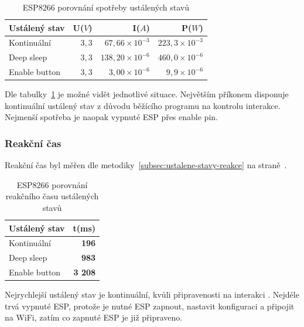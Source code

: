 \documentclass[a4paper, 12pt]{report}
\begin{document}
    \begin{table}[h]
        \centering
        \caption{ESP8266 porovnání spotřeby ustálených stavů}
        \begin{tabular}{||l|r r r||}
            \hline
            Ustálený stav & U($V$) & I($A$)                  & P($W$)                 \\
            \hline
            Kontinuální   & $3,3$  & $67,66 \times 10^{-3}$  & $223,3 \times 10^{-3}$ \\
            Deep sleep    & $3,3$  & $138,20 \times 10^{-6}$ & $460,0 \times 10^{-6}$ \\
            Enable button & $3,3$  & $3,00\times 10^{-6}$    & $9,9\times 10^{-6}$    \\
            \hline
        \end{tabular}
        \label{tab:esp8266-klidove-rezimy-spotreba}
    \end{table}
    Dle tabulky~\ref{tab:esp8266-klidove-rezimy-spotreba} je možné vidět jednotlivé situace. Největším příkonem disponuje kontinuální ustálený stav z důvodu běžícího programu na kontrolu interakce. Nejmenší spotřeba je naopak vypnuté ESP přes enable pin. \\

    \subsubsection{Reakční čas}
    Reakční čas byl měřen dle metodiky~\ref{subsec:ustalene-stavy-reakce} na straně~\pageref{subsec:ustalene-stavy-reakce}.
    \begin{table}[]
        \centering
        \caption{ESP8266 porovnání reakčního času ustálených stavů}
        \begin{tabular}{||l|r||}
            \hline
            Ustálený stav & t(ms)          \\
            \hline
            Kontinuální   & \textbf{196}   \\
            Deep sleep    & \textbf{983}   \\
            Enable button & \textbf{3 208} \\
            \hline
        \end{tabular}
        \label{tab:esp8266-klidove-rezimy-cas}
    \end{table}
    Nejrychlejší ustálený stav je kontinuální, kvůli připravenosti na interakci . Nejdéle trvá vypnuté ESP, protože je nutné ESP zapnout, nastavit konfiguraci a připojit na WiFi, zatím co zapnuté ESP je již připraveno.
\end{document}
